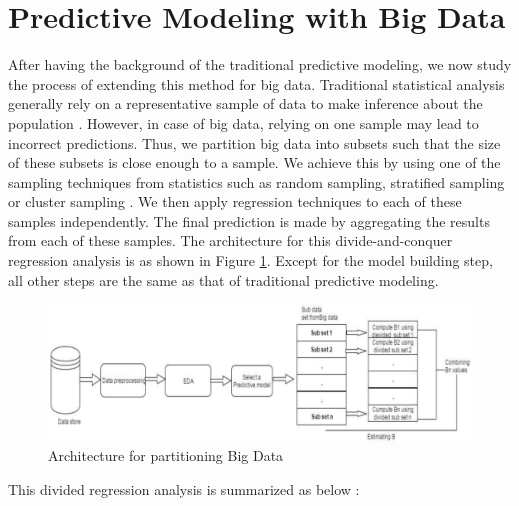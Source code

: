 \documentclass[sigconf]{acmart}
\begin{document}
\section{Predictive Modeling with Big Data}

After having the background of the traditional predictive modeling, we now study the process of extending this method for big data. Traditional statistical analysis generally rely on a representative sample of data to make inference about the population \cite{part-reg}. However, in case of big data, relying on one sample may lead to incorrect predictions. Thus, we partition big data into subsets such that the size of these subsets is close enough to a sample. We achieve this by using one of the sampling techniques from statistics such as random sampling, stratified sampling or cluster sampling \cite{div-reg}. We then apply regression techniques to each of these samples independently. The final prediction is made by aggregating the results from each of these samples. The architecture for this divide-and-conquer regression analysis is as shown in Figure \ref{fig:Fig2}. Except for the model building step, all other steps are the same as that of traditional predictive modeling.

\begin{figure}[!ht]
  \centering\includegraphics[width=\columnwidth]{images/Fig2.png}
  \caption{Architecture for partitioning Big Data \cite{part-reg}}
  \label{fig:Fig2}
\end{figure}

This divided regression analysis is summarized as below \cite{div-reg}:
\end{document}
